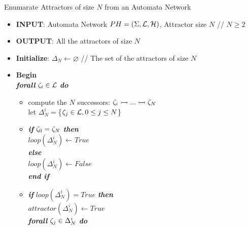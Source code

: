 \begin{algorithm}[!h]
	\caption{Enumarate Attractors of size $N$ from an Automata Network}
	\label{alg:PH-attractor}
	\begin{itemize}
		\item[] \textbf{INPUT}: Automata Network $PH=(\Sigma,\mathcal{L},\mathcal{H})$, Attractor size $N$ // $N \geq 2$
		\item[] \textbf{OUTPUT}: All the attractors of size $N$
		\item[] \textbf{Initialize}: $\Delta_N \longleftarrow \varnothing$ // The set of the attractors of size $N$
		\item[] \textbf{Begin} \\
		
			\hspace{0.2cm}	\textbf{\textit{forall}} $\zeta_i \in \mathcal{L}$ \textbf{\textit{do}} 
				
				\begin{itemize}
					\item[] compute the $N$ successors: $\zeta_i \rightarrowtail ... \rightarrowtail \zeta_N$ \\ let $\Delta_N^i=$\{$\zeta_j \in \mathcal{L}, 0 \leq j \leq N$\} %
					
					\item[] \textbf{\textit{if}} $\zeta_0 = \zeta_N$ \textbf{\textit{then}} \\
						\hspace{0.5cm}  $loop(\Delta_N^i) \longleftarrow True$ \\
					 \textbf{\textit{else}} \\
					 	\hspace{0.5cm}  $loop(\Delta_N^i) \longleftarrow False$ \\
					 \textbf{\textit{end if}} 
					 
					\item[] \textbf{\textit{if}} $loop(\Delta_N^i) = True$ \textbf{\textit{then}} \\
					
							\hspace{0.7cm} $attractor(\Delta_N^i) \longleftarrow True$	\\
							
							\hspace{0.7cm} \textbf{\textit{forall}} $\zeta_j \in \Delta_N^i$ \textbf{\textit{do}} \\
							

\end{itemize}
\end{itemize}
\end{algorithm}
